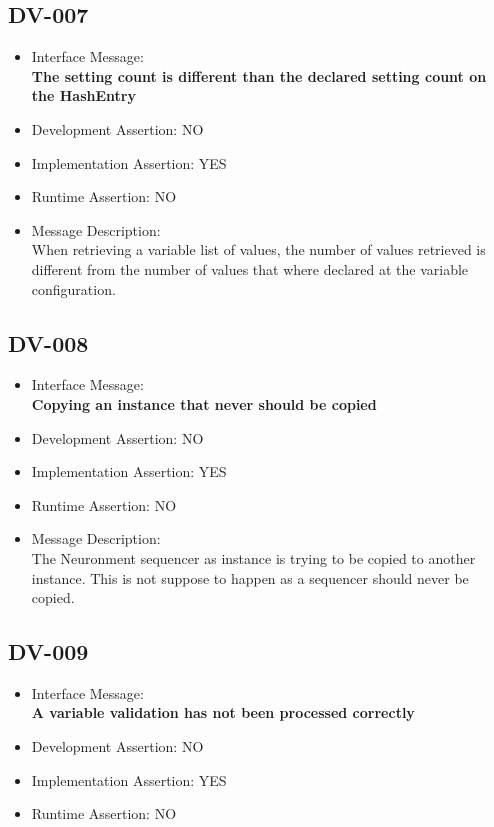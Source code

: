 \subsection{DV-007}
\begin{itemize}
  \item Interface Message:\\[1em]
    \textbf{The setting count is different than the declared setting count on the HashEntry}
  \item Development Assertion: NO
  \item Implementation Assertion: YES
  \item Runtime Assertion: NO
  \item Message Description:\\[1em]
    When retrieving a variable list of values, the number of values retrieved is different from the number of values that where declared at the variable configuration.
\end{itemize}

\subsection{DV-008}
\begin{itemize}
  \item Interface Message:\\[1em]
    \textbf{Copying an instance that never should be copied}
  \item Development Assertion: NO
  \item Implementation Assertion: YES
  \item Runtime Assertion: NO
  \item Message Description:\\[1em]
    The Neuronment sequencer as instance is trying to be copied to another instance. This is not suppose to happen as a sequencer should never be copied.
\end{itemize}

\subsection{DV-009}
\begin{itemize}
  \item Interface Message:\\[1em]
    \textbf{A variable validation has not been processed correctly}
  \item Development Assertion: NO
  \item Implementation Assertion: YES
  \item Runtime Assertion: NO
\end{itemize}

